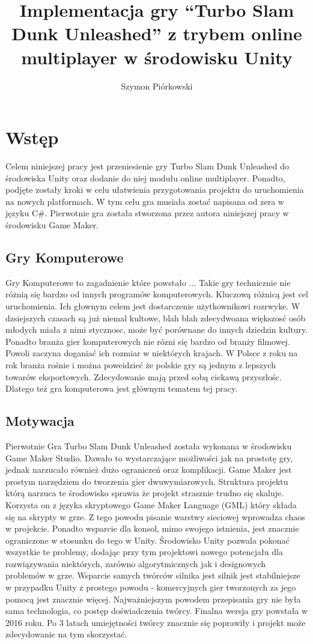 \documentclass[a4paper,12pt,twoside,openany]{report}
\title{Implementacja gry “Turbo Slam Dunk Unleashed” z trybem online multiplayer w środowisku Unity}
\author{Szymon Piórkowski}
\begin{document}
\maketitle

\chapter{Wstęp}
Celem niniejszej pracy jest przeniesienie gry Turbo Slam Dunk Unleashed do środowiska Unity oraz dodanie do niej modułu online multiplayer. Ponadto, podjęte zostały kroki w celu ułatwienia przygotowania projektu do uruchomienia na nowych platformach. W tym celu gra musiała zostać napisana od zera w języku C\#. Pierwotnie gra została stworzona przez autora niniejszej pracy w środowisku Game Maker.

\section{Gry Komputerowe}
Gry Komputerowe to zagadnienie które powstało ... 
Takie gry technicznie nie różnią się bardzo od innych programów komputerowych. Kluczową różnicą jest cel uruchomienia. Ich głownym celem jest dostarczenie użytkownikowi rozrwyke. W dzsiejszych czasach są już niemal kultowe, blah blah zdecydwoana większosć osób młodych miała z nimi stycznosc, może być porównane do innych dziedzin kultury. Ponadto branża gier komputerowych nie rózni się bardzo od branży filmowej. Powoli zaczyna doganiać ich rozmiar w niektórych krajach. W Polsce z roku na rok branża rośnie i można poweidzieć że polskie gry są jednym z lepszych towarów eksportowych. Zdecydowanie mają przed sobą ciekawą przyszłośc. Dlatego też gra komputerowa jest głównym tematem tej pracy. 

\section{Motywacja}
Pierwotnie Gra Turbo Slam Dunk Unleashed została wykonana w środowisku Game Maker Studio. Dawało to wystarczające możliwości jak na prostotę gry, jednak narzucało również dużo ograniczeń oraz komplikacji. Game Maker jest prostym narzędziem do tworzenia gier dwuwymiarowych. Struktura projektu którą narzuca te środowisko sprawia że projekt strasznie trudno się skaluje. Korzysta on z języka skryptowego Game Maker Language (GML) który składa się na skrypty w grze. Z tego powodu pisanie warstwy sieciowej wprowadza chaos w projekcie. Ponadto wsparcie dla konsol, mimo swojego istnienia, jest znacznie ograniczone w stosunku do tego w Unity. Środowisko Unity pozwala pokonać wszystkie te problemy, dodając przy tym projektowi nowego potencjału dla rozwiązywania niektórych, zarówno algorytmicznych jak i designowych problemów w grze. Wsparcie samych twórców silnika jest silnik jest stabilniejsze w przypadku Unity z prostego powodu - komercyjnych gier tworzonych za jego pomocą jest znacznie więcej. Najważniejszym powodem przepisania gry nie była sama technologia, co postęp doświadczenia twórcy. Finalna wersja gry powstała w 2016 roku. Po 3 latach umiejętności twórcy znacznie się poprawiły i projekt może zdecydowanie na tym skorzystać. 
\end{document}
